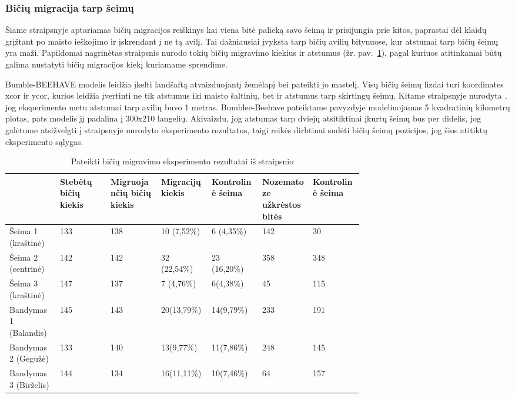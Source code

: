 \documentclass{VUMIFKompMagistrinis}
\begin{document}
\subsubsection[Bi\v{c}i\k{u} migracija tarp \v{s}eim\k{u}]{Bi\v{c}i\k{u} migracija tarp \v{s}eim\k{u}}
Šiame straipsnyje \cite{PfC98} aptariamas bičių migracijos reiškinys kai viena bitė palieką savo šeimą ir prisijungia prie kitos, paprastai dėl klaidų grįžtant po maisto ieškojimo ir įskrendant į ne tą avilį. Tai dažniausiai įvyksta tarp bičių avilių bitynuose, kur atstumai tarp bičių šeimų yra maži. Papildomai nagrinėtas straipsnis \cite{BPC16} nurodo tokių bičių migravimo kiekius ir atstumus (žr. pav.~\ref{tab:tsp}), pagal kuriuos atitinkamai būtų galima nustatyti bičių migracijos kiekį kuriamame sprendime.

Bumble-BEEHAVE modelis leidžia įkelti landšaftą atvaizduojantį žemėlapį bei pateikti jo mastelį. Visų bičių šeimų lizdai turi koordinates xcor ir ycor, kurios leidžia įvertinti ne tik atstumus iki maisto šaltinių, bet ir atstumus tarp skirtingų šeimų. Kitame straipsnyje nurodyta \cite{BPC16}, jog eksperimento metu atstumai tarp avilių buvo 1 metras. Bumblee-Beehave pateiktame pavyzdyje modeliuojamas 5 kvadratinių kilometrų plotas, pats modelis jį padalina į 300x210 langelių. Akivaizdu, jog atstumas tarp dviejų atsitiktinai įkurtų šeimų bus per didelis, jog galėtume atsižvelgti į straipsnyje nurodyto eksperimento rezultatus, taigi reikės dirbtinai sudėti bičių šeimų pozicijos, jog šios atitiktų eksperimento sąlygas. 
\begin{table}[H]\footnotesize
  \centering
  \caption{Pateikti bičių migravimo eksperimento rezultatai iš straipsnio \cite{BPC16}}
  \label{tab:tsp}
  \begin{tabular}{p{0.1\linewidth}p{0.1\linewidth}p{0.1\linewidth}p{0.1\linewidth}p{0.1\linewidth}p{0.1\linewidth}p{0.1\linewidth}} \hline
	 & Stebėtų bičių kiekis&	Migruojančių bičių kiekis&	Migracijų kiekis&	Kontrolinė šeima&	Nozematoze užkrėstos bitės&	Kontrolinė šeima
	 \\
	 \hline
Šeima 1 (kraštinė) &	133 &	138 &	10 (7,52\%) &	6 (4,35\%) &	142&	30 \\
Šeima 2 (centrinė)& 	142& 	142& 	32 (22,54\%)& 	23 (16,20\%)& 	358&	348\\
Šeima 3 (kraštinė)& 	147& 	137&	7 (4,76\%)& 	6(4,38\%)&  	45& 	115\\
Bandymas 1 (Balandis)&	145&	143&	20(13,79\%)&	14(9,79\%)&	    233& 	191\\
Bandymas 2 (Gegužė)&	133&	140&	13(9,77\%)&	    11(7,86\%)&	    248& 	145\\
Bandymas 3 (Birželis)&	144&	134&	16(11,11\%)&	10(7,46\%)&	    64& 	157\\
  \end{tabular}
\end{table}
\end{document}
